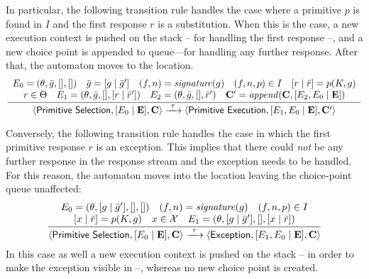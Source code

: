 \documentclass[12pt,a4paper,openright,twoside]{book}
\begin{document}
In particular, the following transition rule handles the case where a primitive $p$ is found in $I$ and the first response $r$ is a substitution.
%
When this is the case, a new execution context is pushed on the stack -- for handling the first response --, and a new choice point is appended to queue---for handling any further response.
%
After that, the automaton moves to the  location.
%
\[
\frac{
    \begin{array}{c}
        E_0 = (\theta, \bar{g}, [], [])
        \quad
        \bar{g} = [g \mid \bar{g}']
        \quad
        (f, n) = \mathit{signature}(g)
        \quad
        (f, n, p) \in I
        \quad
        [r \mid \bar{r}] = p(K, g)
        \\
        r \in \Theta
        \quad
        E_1 = (\theta, \bar{g}, [], [r \mid \bar{r}'])
        \quad
        E_2 = (\theta, \bar{g}, [], \bar{r}')
        \quad
        \mathbf{C}' = \mathit{append}(\mathbf{C}, [E_2, E_0 \mid \mathbf{E}])
    \end{array}
}{
    \langle \textsf{Primitive Selection}, [E_0 \mid \mathbf{E}], \mathbf{C} \rangle
    \xrightarrow{\ \tau\ }
    \langle \textsf{Primitive Execution}, [E_1, E_0 \mid \mathbf{E}], \mathbf{C}' \rangle
}
\]
%
%
%

Conversely, the following transition rule handles the case in which the first primitive response $r$ is an exception.
%
This implies that there could \emph{not} be any further response in the response stream and the exception needs to be handled.
%
For this reason, the automaton moves into the  location leaving the choice-point queue unaffected:
%
\[
\frac{
    \begin{array}{c}
        E_0 = (\theta, [g \mid \bar{g}'], [], [])
        \quad
        (f, n) = \mathit{signature}(g)
        \quad
        (f, n, p) \in I
        \\
        \left[x \mid \bar{r}\right] = p(K, g)
        \quad
        x \in \mathcal{X}
        \quad
        E_1 = (\theta, [g \mid \bar{g}'], [], [x \mid \bar{r}])
    \end{array}
}{
    \langle \textsf{Primitive Selection}, [E_0 \mid \mathbf{E}], \mathbf{C} \rangle
    \xrightarrow{\ \tau\ }
    \langle \textsf{Exception}, [E_1, E_0 \mid \mathbf{E}], \mathbf{C} \rangle
}
\]
%
In this case as well a new execution context is pushed on the stack -- in order to make the exception visible in  --, whereas no new choice point is created.
\end{document}
